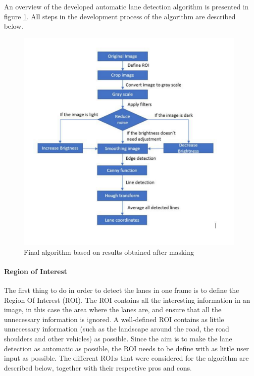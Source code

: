 An overview of the developed automatic lane detection algorithm is presented in figure \ref{fig:my_label}. All steps in the development process of the algorithm are described below.

\begin{figure}[H]
    \centering
    \includegraphics[width=\textwidth]{Figures/Algorithm.pdf}
    \caption{Final algorithm based on results obtained after masking}
    \label{fig:my_label}
\end{figure}

\paragraph{Region of Interest}

The first thing to do in order to detect the lanes in one frame is to define the Region Of Interest (ROI). The ROI contains all the interesting information in an image, in this case the area where the lanes are, and ensure that all the unnecessary information is ignored. A well-defined ROI contains as little unnecessary information (such as the landscape around the road, the road shoulders and other vehicles) as possible. Since the aim is to make the lane detection as automatic as possible, the ROI needs to be define with as little user input as possible. The different ROI:s that were considered for the algorithm are described below, together with their respective pros and cons.

